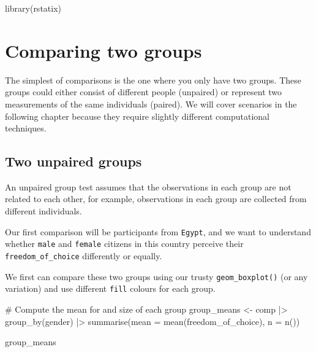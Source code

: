 \documentclass[
  letterpaper,
]{krantz}
\makeatletter
\newenvironment{Shaded}{\begin{snugshade}}{\end{snugshade}}
\newcommand{\AttributeTok}[1]{\textcolor[rgb]{0.40,0.45,0.13}{#1}}
\newcommand{\CommentTok}[1]{\textcolor[rgb]{0.37,0.37,0.37}{#1}}
\newcommand{\FunctionTok}[1]{\textcolor[rgb]{0.28,0.35,0.67}{#1}}
\newcommand{\NormalTok}[1]{\textcolor[rgb]{0.00,0.23,0.31}{#1}}
\newcommand{\OtherTok}[1]{\textcolor[rgb]{0.00,0.23,0.31}{#1}}
\newcommand{\SpecialCharTok}[1]{\textcolor[rgb]{0.37,0.37,0.37}{#1}}
\newenvironment{kframe}{%
\medskip{}
\setlength{\fboxsep}{.8em}
 \def\at@end@of@kframe{}%
 \ifinner\ifhmode%
  \def\at@end@of@kframe{\end{minipage}}%
  \begin{minipage}{\columnwidth}%
 \fi\fi%
 \def\FrameCommand##1{\hskip\@totalleftmargin \hskip-\fboxsep
 \colorbox{shadecolor}{##1}\hskip-\fboxsep
     \hskip-\linewidth \hskip-\@totalleftmargin \hskip\columnwidth}%
 \MakeFramed {\advance\hsize-\width
   \@totalleftmargin\z@ \linewidth\hsize
   \@setminipage}}%
 {\par\unskip\endMakeFramed%
 \at@end@of@kframe}
\renewenvironment{Shaded}{\begin{kframe}}{\end{kframe}}
\makeatother
\begin{document}
\begin{Shaded}
\begin{Highlighting}[]
\FunctionTok{library}\NormalTok{(rstatix)}
\end{Highlighting}
\end{Shaded}

\section{Comparing two groups}\label{sec-comparing-two-groups}

The simplest of comparisons is the one where you only have two groups.
These groups could either consist of different people (unpaired) or
represent two measurements of the same individuals (paired). We will
cover scenarios in the following chapter because they require slightly
different computational techniques.

\subsection{Two unpaired groups}\label{sec-two-unpaired-groups}

An unpaired group test assumes that the observations in each group are
not related to each other, for example, observations in each group are
collected from different individuals.

Our first comparison will be participants from \texttt{Egypt}, and we
want to understand whether \texttt{male} and \texttt{female} citizens in
this country perceive their \texttt{freedom\_of\_choice} differently or
equally.

We first can compare these two groups using our trusty
\texttt{geom\_boxplot()} (or any variation) and use different
\texttt{fill} colours for each group.

\begin{Shaded}
\begin{Highlighting}[]
\CommentTok{\# Compute the mean for and size of each group}
\NormalTok{group\_means }\OtherTok{\textless{}{-}}
\NormalTok{  comp }\SpecialCharTok{|\textgreater{}}
  \FunctionTok{group\_by}\NormalTok{(gender) }\SpecialCharTok{|\textgreater{}}
  \FunctionTok{summarise}\NormalTok{(}\AttributeTok{mean =} \FunctionTok{mean}\NormalTok{(freedom\_of\_choice),}
            \AttributeTok{n =} \FunctionTok{n}\NormalTok{())}

\NormalTok{group\_means}
\end{Highlighting}
\end{Shaded}
\end{document}
